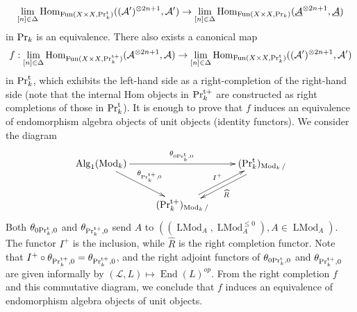 \documentclass[leqno,12pt]{amsart}
\theoremstyle{plain}
\theoremstyle{definition}
\newcommand{\PR}{\textup{Pr}}
\newcommand{\PRT}{\textup{Pr}^{\textup{t}}}
\newcommand{\PRTT}{\textup{Pr}^{\textup{t}+}}
\newcommand{\Hom}{\operatorname{Hom}}
\newcommand{\Mod}{\operatorname{Mod}}
\newcommand{\Fun}{\operatorname{Fun}}
\newcommand{\Alg}{\operatorname{Alg}}
\newcommand{\End}{\operatorname{End}}
\newcommand{\LMod}{\operatorname{LMod}}
\begin{document}
\[
\lim_{[n]\in \Delta}\Hom_{\Fun(X\times X,\PRT_k)}((\mathcal{A}')^{\otimes 2n+1},\mathcal{A}') \to \lim_{[n]\in \Delta}\Hom_{\Fun(X\times X,\PR_k)}( \underline{\mathcal{A}}^{\otimes 2n+1},\underline{\mathcal{A}})
\]
in $\PR_k$ is an equivalence.
There also exists a canonical map
\[
f:\lim_{[n]\in \Delta}\Hom_{\Fun(X\times X,\PRTT_k)}( \mathcal{A}^{\otimes 2n+1},\mathcal{A}) \to \lim_{[n]\in \Delta}\Hom_{\Fun(X\times X,\PRT_k)}((\mathcal{A}')^{\otimes 2n+1},\mathcal{A}') 
\]
in $\PRT_k$, which exhibits the left-hand side as a right-completion of the right-hand side (note that the internal Hom objects in $\PRTT_k$ are constructed 
as right completions of those in $\PRT_k$). It is enough to prove that $f$ induces an equivalence of endomorphism algebra objects of unit objects (identity functors).
We consider the diagram  
\[
\xymatrix{
\Alg_1(\Mod_k)  \ar[rr]^{\theta_{0\PRT_k,0}} \ar[rd]^{\theta_{\PRTT_k,0}} &  &  (\PRT_k)_{\Mod_k/} \ar@<0.5ex>[ld]^{\widehat{R}} \\
  & (\PRTT_k)_{\Mod_k/} \ar@<0.5ex>[ru]^{I^+}&  
}
\]
Both $\theta_{0\PRT_k,0}$ and $\theta_{\PRTT_k,0}$ send $A$ to $((\LMod_A,\LMod_A^{\le0}), A\in \LMod_A)$.
The functor $I^+$ is the inclusion, while $\widehat{R}$ is the right completion functor.
Note that $I^+ \circ \theta_{\PRTT_k,0}=\theta_{\PRTT_k,0}$, and the right adjoint functors of $\theta_{0\PRT_k,0}$ and $\theta_{\PRTT_k,0}$ are given informally by
$(\mathcal{L},L)\mapsto \End(L)^{op}$. From the right completion $f$ and this commutative diagram, 
we conclude that $f$ induces an equivalence of endomorphism algebra objects of unit objects.
\end{document}
